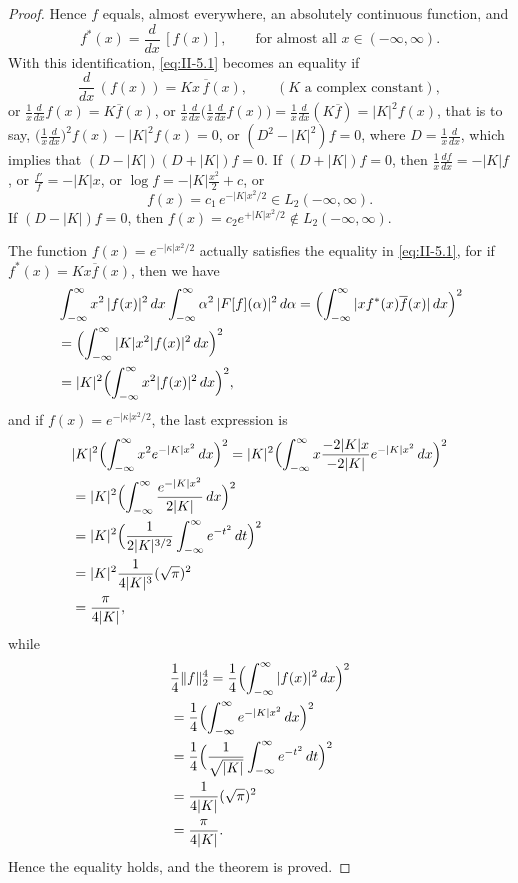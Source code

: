 \begin{proof}
Hence $f$ equals, almost everywhere, an absolutely continuous function, and
\begin{equation}\tag{5.14}\label{eq:II-5.14}
f^{*}(x)=\frac{d}{dx}\,[f(x)],\qquad\text{for almost all }x\in(-\infty,\infty).
\end{equation}
With this identification, \eqref{eq:II-5.1} becomes an equality if
\[
\frac{d}{dx}\,(f(x))=K x\,\overline{f}(x),\qquad(K\text{ a complex constant}),
\]
or $\frac{1}{x}\frac{d}{dx}f(x)=K\overline{f}(x)$, or $\frac{1}{x}\frac{d}{dx}\bigl(\frac{1}{x}\frac{d}{dx}f(x)\bigr)=\frac{1}{x}\frac{d}{dx}(K\overline{f})=|K|^{2}f(x)$, that is to say, $\bigl(\frac{1}{x}\frac{d}{dx}\bigr)^{2}f(x)-|K|^{2}f(x)=0$, or $(D^{2}-|K|^{2})f=0$, where $D=\frac{1}{x}\frac{d}{dx}$, which implies that $(D-|K|)(D+|K|)f=0$.
If $(D+|K|)f=0$, then $\frac{1}{x}\frac{df}{dx}=-|K|f$, or $\frac{f'}{f}=-|K|x$, or $\log f=-|K|\frac{x^{2}}{2}+c$,
or
\begin{equation}\tag{5.15}\label{eq:II-5.15}
f(x)=c_{1}\,e^{-|K|x^{2}/2}\in L_{2}(-\infty,\infty).
\end{equation}
If $(D-|K|)f=0$, then $f(x)=c_{2}e^{+|K|x^{2}/2}\notin L_{2}(-\infty,\infty)$.

The function $f(x)=e^{-|\kappa|x^{2}/2}$ actually satisfies the equality in \eqref{eq:II-5.1}, for if $f^{*}(x)=K x\overline{f}(x)$, then we have
\[
\begin{aligned}
&\int_{-\infty}^{\infty}x^{2}\,|f(x)|^{2}\,dx
\int_{-\infty}^{\infty}\alpha^{2}\,|F[f](\alpha)|^{2}\,d\alpha = \Bigl(\int_{-\infty}^{\infty}|x f^{*}(x)\overline{f}(x)|\,dx\Bigr)^{2}\\
&= \Bigl(\int_{-\infty}^{\infty}|K|x^{2}|f(x)|^{2}\,dx\Bigr)^{2}\\
&= |K|^{2}\Bigl(\int_{-\infty}^{\infty}x^{2}|f(x)|^{2}\,dx\Bigr)^{2},
\end{aligned}
\]
and if $f(x)=e^{-|\kappa|x^{2}/2}$, the last expression is
\[
\begin{aligned}
&|K|^{2}\Bigl(\int_{-\infty}^{\infty}x^{2}e^{-|K|x^{2}}\,dx\Bigr)^{2} = |K|^{2}\Bigl(\int_{-\infty}^{\infty}x\frac{-2|K|x}{-2|K|}e^{-|K|x^{2}}\,dx\Bigr)^{2}\\
&= |K|^{2}\Bigl(\int_{-\infty}^{\infty}\frac{e^{-|K|x^{2}}}{2|K|}\,dx\Bigr)^{2}\\
&= |K|^{2}\Bigl(\frac{1}{2|K|^{3/2}}\int_{-\infty}^{\infty}e^{-t^{2}}\,dt\Bigr)^{2}\\
&= |K|^{2}\frac{1}{4|K|^{3}}(\sqrt{\pi})^{2}\\
&= \frac{\pi}{4|K|},
\end{aligned}
\]
while
\[
\begin{aligned}
&\frac{1}{4}\|f\|_{2}^{4} = \frac{1}{4}\Bigl(\int_{-\infty}^{\infty}|f(x)|^{2}\,dx\Bigr)^{2}\\
&= \frac{1}{4}\Bigl(\int_{-\infty}^{\infty}e^{-|K|x^{2}}\,dx\Bigr)^{2}\\
&= \frac{1}{4}\Bigl(\frac{1}{\sqrt{|K|}}\int_{-\infty}^{\infty}e^{-t^{2}}\,dt\Bigr)^{2}\\
&= \frac{1}{4|K|}(\sqrt{\pi})^{2}\\
&= \frac{\pi}{4|K|}.
\end{aligned}
\]
Hence the equality holds, and the theorem is proved.
\end{proof}

